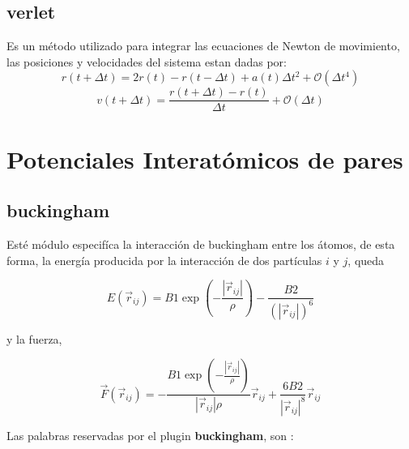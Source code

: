 \subsection{verlet}
Es un m\'etodo utilizado para integrar las ecuaciones de Newton de movimiento, las posiciones y velocidades del sistema estan dadas por:
$$r(t+\Delta t) = 2r(t) - r(t-\Delta t) + a(t)\Delta t^2 + \mathcal{O}(\Delta t^4)$$
$$v(t+\Delta t) = \frac{r(t+\Delta t) - r(t)}{\Delta t} + \mathcal{O}(\Delta t)$$



\section{Potenciales Interat\'omicos de pares}

\subsection{buckingham}

Est\'e m\'odulo especif\'ica la interacci\'on de buckingham entre los \'atomos, de esta forma, la energ\'ia producida por la interacci\'on de dos part\'iculas $i$ y $j$, queda

$$E(\vec{r}_{ij}) = B1 \exp\left(-\frac{|\vec{r}_{ij}|}{\rho}\right) - \frac{B2}{(|\vec{r}_{ij}|)^6}$$

y la fuerza,

$$\vec{F}(\vec{r}_{ij}) = -\frac{B1\exp\left(-\frac{|\vec{r}_{ij}|}{\rho}\right)}{|\vec{r}_{ij}|\rho}\vec{r}_{ij} + \frac{6B2}{|\vec{r}_{ij}|^8}\vec{r}_{ij}$$

Las palabras reservadas por el plugin \textbf{buckingham}, son :


